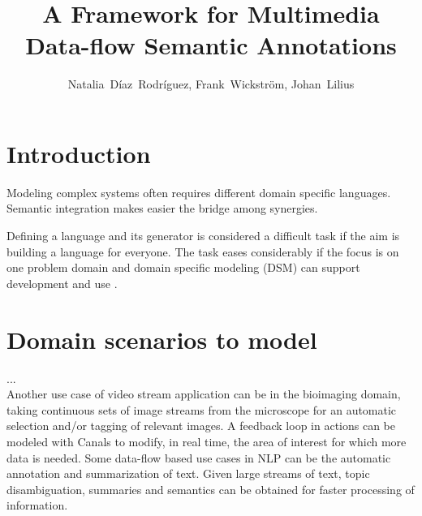 \documentclass[[10pt,abbrv]{llncs}
\begin{document}
\title{A Framework for Multimedia Data-flow Semantic Annotations } %

\author{Natalia~Díaz~Rodríguez, Frank~Wickström, Johan~Lilius}

\maketitle

\begin{abstract}


\end{abstract}


\section{Introduction}
Modeling complex systems often requires different domain specific languages. Semantic integration makes easier the bridge among synergies.

Defining a language and its generator is considered a difficult task if the aim is building a language for everyone. The task eases considerably if the focus is on one problem domain and domain specific modeling (DSM) can support development and use \cite{Tolvanen2009}. %


\section{Domain scenarios to model}

...\\
Another use case of video stream application can be in the bioimaging domain, taking continuous sets of image streams from the microscope for an automatic selection and/or tagging of relevant images. A feedback loop in actions can be modeled with Canals to modify, in real time, the area of interest for which more data is needed.
Some data-flow based use cases in NLP can be the automatic annotation and summarization of text. Given large streams of text, topic disambiguation, summaries and semantics can be obtained for faster processing of information. %
\end{document}
